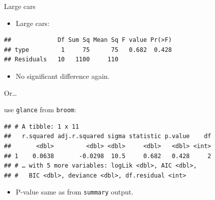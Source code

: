 \documentclass[ignorenonframetext,]{beamer}
\newenvironment{Shaded}{\begin{snugshade}}{\end{snugshade}}
\newcommand{\DataTypeTok}[1]{\textcolor[rgb]{0.13,0.29,0.53}{#1}}
\newcommand{\KeywordTok}[1]{\textcolor[rgb]{0.13,0.29,0.53}{\textbf{#1}}}
\newcommand{\NormalTok}[1]{#1}
\newcommand{\OperatorTok}[1]{\textcolor[rgb]{0.81,0.36,0.00}{\textbf{#1}}}
\newcommand{\StringTok}[1]{\textcolor[rgb]{0.31,0.60,0.02}{#1}}
\providecommand{\tightlist}{%
  \setlength{\itemsep}{0pt}\setlength{\parskip}{0pt}}
\begin{document}
\begin{frame}[fragile]{Large cars}
\protect\hypertarget{large-cars}{}

\begin{itemize}
\tightlist
\item
  Large cars:
\end{itemize}

\begin{Shaded}
\end{Shaded}

\begin{verbatim}
##             Df Sum Sq Mean Sq F value Pr(>F)
## type         1     75      75   0.682  0.428
## Residuals   10   1100     110
\end{verbatim}

\begin{itemize}
\tightlist
\item
  No significant difference again.
\end{itemize}

\end{frame}

\begin{frame}[fragile]{Or\ldots }
\protect\hypertarget{or}{}

use \texttt{glance} from \texttt{broom}:

\small

\begin{Shaded}
\end{Shaded}

\begin{verbatim}
## # A tibble: 1 x 11
##   r.squared adj.r.squared sigma statistic p.value    df
##       <dbl>         <dbl> <dbl>     <dbl>   <dbl> <int>
## 1    0.0638       -0.0298  10.5     0.682   0.428     2
## # … with 5 more variables: logLik <dbl>, AIC <dbl>,
## #   BIC <dbl>, deviance <dbl>, df.residual <int>
\end{verbatim}

\normalsize

\begin{itemize}
\tightlist
\item
  P-value same as from \texttt{summary} output.
\end{itemize}

\end{frame}
\end{document}
